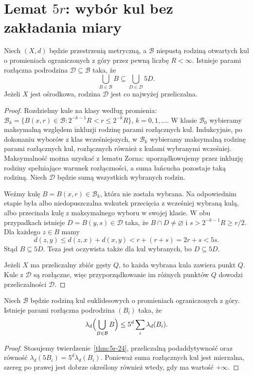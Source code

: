 \section{Lemat $5r$: wybór kul bez zakładania miary}
\begin{twierdzenie}
\label{thm:5r-24}
Niech $(X,d)$ będzie przestrzenią metryczną, a $\mathcal B$
niepustą rodziną otwartych kul o promieniach ograniczonych
z góry przez pewną liczbę $R<\infty$.
Istnieje parami rozłączna podrodzina $\mathcal D\subseteq\mathcal B$
taka, że
\[
 \bigcup_{B\in\mathcal B}B\subseteq\bigcup_{D\in\mathcal D}5D.
\]
Jeżeli $X$ jest ośrodkowa, rodzina $\mathcal D$ jest co najwyżej
przeliczalna.
\end{twierdzenie}
\begin{proof}
Rozdzielmy kule na klasy według promienia:
$\mathcal B_k=\{B(x,r)\in\mathcal B:
2^{-k-1}R<r\le2^{-k}R\}$, $k=0,1,\ldots$.
W klasie $\mathcal B_0$ wybieramy maksymalną względem inkluzji
rodzinę parami rozłącznych kul. Indukcyjnie, po dokonaniu wyborów
z klas wcześniejszych, w $\mathcal B_k$ wybieramy maksymalną
rodzinę parami rozłącznych kul, rozłącznych również z kulami
wybranymi wcześniej. Maksymalność można uzyskać z lematu
Zorna: uporządkowujemy przez inkluzję rodziny spełniające
warunek rozłączności, a suma łańcucha pozostaje taką rodziną.
Niech $\mathcal D$ będzie sumą wszystkich wybranych rodzin.

Weźmy kulę $B=B(x,r)\in\mathcal B_k$, która nie została
wybrana. Na odpowiednim etapie była albo niedopuszczalna
wskutek przecięcia z wcześniej wybraną kulą, albo przecinała
kulę z maksymalnego wyboru w swojej klasie. W obu przypadkach
istnieje $D=B(y,s)\in\mathcal D$ taka, że $B\cap D\ne\varnothing$
i $s>2^{-k-1}R\ge r/2$. Dla każdego $z\in B$ mamy
\[
 d(z,y)\le d(z,x)+d(x,y)<r+(r+s)=2r+s<5s.
\]
Stąd $B\subseteq5D$. Teza jest oczywista także dla kul
wybranych, bo $D\subseteq5D$.

Jeżeli $X$ ma przeliczalny zbiór gęsty $Q$, to każda wybrana
kula zawiera punkt $Q$. Kule z $\mathcal D$ są rozłączne,
więc przyporządkowanie im różnych punktów $Q$ dowodzi
przeliczalności $\mathcal D$.
\end{proof}

\begin{wniosek}
\label{cor:5r-volume-24}
Niech $\mathcal B$ będzie rodziną kul euklidesowych o promieniach
ograniczonych z góry. Istnieje parami rozłączna podrodzina
$(B_i)$ taka, że
\[
 \lambda_d\Bigl(\bigcup_{B\in\mathcal B}B\Bigr)
 \le 5^d\sum_i\lambda_d(B_i).
\]
\end{wniosek}
\begin{proof}
Stosujemy twierdzenie~\ref{thm:5r-24}, przeliczalną
podaddytywność oraz równość $\lambda_d(5B_i)=5^d\lambda_d(B_i)$.
Ponieważ suma rozłącznych kul jest mierzalna, szereg po prawej
jest dobrze określony również wtedy, gdy ma wartość $+\infty$.
\end{proof}

